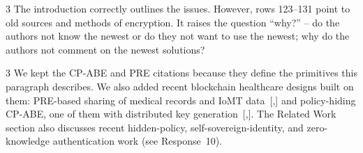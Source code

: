 \begin{reviewcomment}{3}
	The introduction correctly outlines the issues. However, rows 123--131 point to old sources and methods of encryption. It raises the question ``why?'' -- do the authors not know the newest or do they not want to use the newest; why do the authors not comment on the newest solutions?
\end{reviewcomment}

\begin{reviewresponse}{3}
	We kept the CP-ABE and PRE citations because they define the primitives this paragraph describes.
	We also added recent blockchain healthcare designs built on them: PRE-based sharing of medical records and IoMT data~[,] and policy-hiding CP-ABE, one of them with distributed key generation~[,].
	The Related Work section also discusses recent hidden-policy, self-sovereign-identity, and zero-knowledge authentication work (see Response~10).

\end{reviewresponse}
